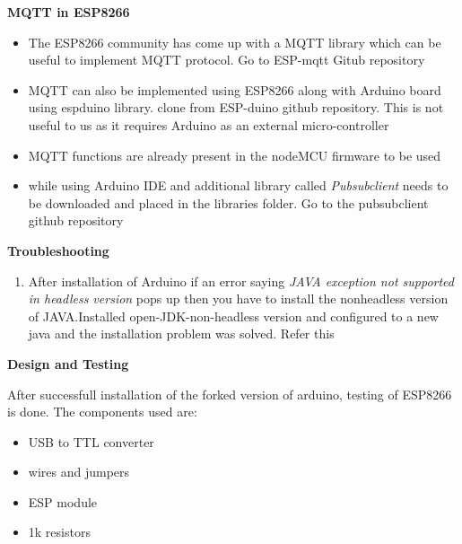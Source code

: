 \documentclass[16pt]{article}
\begin{document}
{\Large{\textbf{MQTT in ESP8266}}}

\begin{itemize}

\item
  The ESP8266 community has come up with a MQTT library which can be
  useful to implement MQTT protocol. Go to ESP-mqtt Gitub repository
 
\item
  MQTT can also be implemented using ESP8266 along with Arduino board
  using espduino library. clone from ESP-duino github repository. This is not
  useful to us as it requires Arduino as an external micro-controller
\item
  MQTT functions are already present in the nodeMCU firmware to be used
\item
  while using Arduino IDE and additional library called
  \emph{Pubsubclient} needs to be downloaded and placed in the libraries
  folder. Go to the pubsubclient github repository
\end{itemize}

{\Large{\textbf{Troubleshooting}}}

\begin{enumerate}



\item
  After installation of Arduino if an error saying \emph{JAVA exception
  not supported in headless version} pops up then you have to install
  the nonheadless version of JAVA.Installed open-JDK-non-headless
  version and configured to a new java and the installation problem was
  solved. Refer this
\end{enumerate}


\vspace{4.7cm}

{\LARGE{\textbf{Design and Testing}}}

After successfull installation of the forked version of arduino, testing
of ESP8266 is done. The components used are:

\begin{itemize}

\item
  USB to TTL converter
\item
  wires and jumpers
\item
  ESP module
\item
  1k resistors
\end{itemize}
\end{document}
